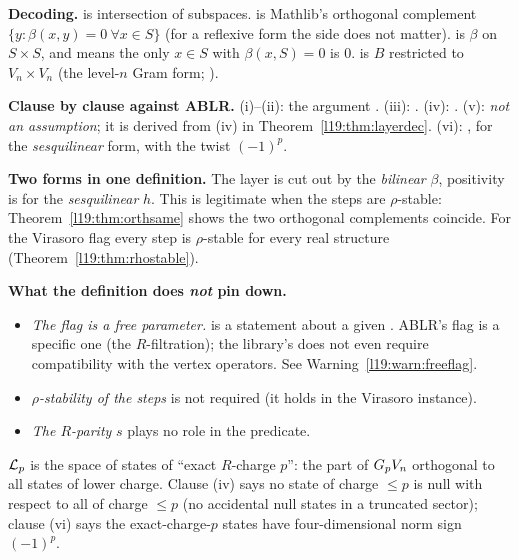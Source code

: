 \begin{dictionary}
\textbf{Decoding.}  is intersection of subspaces.  is Mathlib's
orthogonal complement $\{y : \beta(x,y) = 0\ \forall x\in S\}$ (for a reflexive form the side does not
matter).  is $\beta$ on $S\times S$, and  means the only
$x\in S$ with $\beta(x,S) = 0$ is $0$.  is $B$ restricted to
$V_n\times V_n$ (the level-$n$ Gram form; ).

\textbf{Clause by clause against ABLR.}
(i)--(ii): the  argument . (iii): . (iv):
. (v): \emph{not an assumption}; it is derived from (iv) in
Theorem~\ref{l19:thm:layerdec}. (vi): , for the \emph{sesquilinear} form, with
the twist $(-1)^p$.

\textbf{Two forms in one definition.} The layer is cut out by the \emph{bilinear}
$\beta$, positivity is for the \emph{sesquilinear} $h$. This is legitimate when the steps are
$\rho$-stable: Theorem~\ref{l19:thm:orthsame} shows the two orthogonal complements coincide. For
the Virasoro flag every step is $\rho$-stable for every real structure
(Theorem~\ref{l19:thm:rhostable}).

\textbf{What the definition does \emph{not} pin down.}
\begin{itemize}
\item \emph{The flag is a free parameter.}  is a statement about a given
  . ABLR's flag is a specific one (the $R$-filtration); the library's  does
  not even require compatibility with the vertex operators. See Warning~\ref{l19:warn:freeflag}.
\item \emph{$\rho$-stability of the steps} is not required (it holds in the Virasoro instance).
\item \emph{The $R$-parity} $s$ plays no role in the predicate.
\end{itemize}
\end{dictionary}

\begin{physics}
$\mathcal{L}_p$ is the space of states of ``exact $R$-charge $p$'': the part of
$G_pV_n$ orthogonal to all states of lower charge. Clause (iv) says no state of charge $\le p$
is null with respect to all of charge $\le p$ (no accidental null states in a truncated sector);
clause (vi) says the exact-charge-$p$ states have four-dimensional norm sign $(-1)^p$.
\end{physics}

